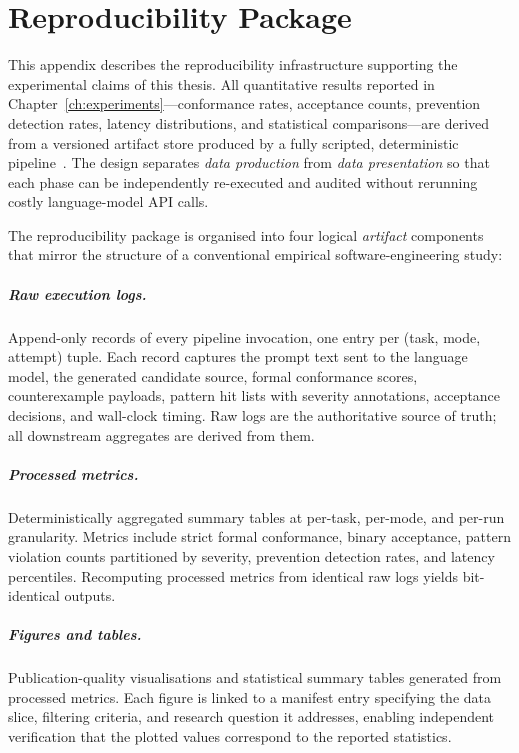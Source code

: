 \chapter{Reproducibility Package}
\label{app:reproducibility}

This appendix describes the reproducibility infrastructure supporting the
experimental claims of this thesis.  All quantitative results reported in
Chapter~\ref{ch:experiments}---conformance rates, acceptance counts, prevention
detection rates, latency distributions, and statistical comparisons---are
derived from a versioned artifact store produced by a fully scripted,
deterministic pipeline~\citep{ammann2016testing,woodcock2009formalsurvey}.  The design separates \emph{data production} from
\emph{data presentation} so that each phase can be independently re-executed
and audited without rerunning costly language-model API calls.

The reproducibility package is organised into four logical \emph{artifact}
components that mirror the structure of a conventional empirical
software-engineering study:

\paragraph{Raw execution logs.}
Append-only records of every pipeline invocation, one entry per
(task, mode, attempt) tuple.  Each record captures the prompt text
sent to the language model, the generated candidate source, formal
conformance scores, counterexample payloads, pattern hit lists with
severity annotations, acceptance decisions, and wall-clock timing.
Raw logs are the authoritative source of truth; all downstream
aggregates are derived from them.

\paragraph{Processed metrics.}
Deterministically aggregated summary tables at per-task, per-mode, and
per-run granularity.  Metrics include strict formal conformance,
binary acceptance, pattern violation counts partitioned by severity,
prevention detection rates, and latency percentiles.  Recomputing
processed metrics from identical raw logs yields bit-identical
outputs.

\paragraph{Figures and tables.}
Publication-quality visualisations and statistical summary tables
generated from processed metrics.  Each figure is linked to a manifest
entry specifying the data slice, filtering criteria, and research
question it addresses, enabling independent verification that the
plotted values correspond to the reported statistics.

